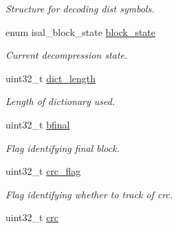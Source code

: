 \begin{DoxyCompactItemize}
\begin{DoxyCompactList}\small\item\em Structure for decoding dist symbols. \end{DoxyCompactList}\item 
\hypertarget{structinflate__state_ac0bb6a4a584fb515a000d6f1be0f2711}{enum isal\-\_\-block\-\_\-state \hyperlink{structinflate__state_ac0bb6a4a584fb515a000d6f1be0f2711}{block\-\_\-state}}\label{structinflate__state_ac0bb6a4a584fb515a000d6f1be0f2711}

\begin{DoxyCompactList}\small\item\em Current decompression state. \end{DoxyCompactList}\item 
\hypertarget{structinflate__state_a7a359006ca174357e69db75fd9e038fe}{uint32\-\_\-t \hyperlink{structinflate__state_a7a359006ca174357e69db75fd9e038fe}{dict\-\_\-length}}\label{structinflate__state_a7a359006ca174357e69db75fd9e038fe}

\begin{DoxyCompactList}\small\item\em Length of dictionary used. \end{DoxyCompactList}\item 
\hypertarget{structinflate__state_acf6d2c8ab990a35b45057f592051c7be}{uint32\-\_\-t \hyperlink{structinflate__state_acf6d2c8ab990a35b45057f592051c7be}{bfinal}}\label{structinflate__state_acf6d2c8ab990a35b45057f592051c7be}

\begin{DoxyCompactList}\small\item\em Flag identifying final block. \end{DoxyCompactList}\item 
\hypertarget{structinflate__state_ab2d3dac9eb492d567e151e8301a92b79}{uint32\-\_\-t \hyperlink{structinflate__state_ab2d3dac9eb492d567e151e8301a92b79}{crc\-\_\-flag}}\label{structinflate__state_ab2d3dac9eb492d567e151e8301a92b79}

\begin{DoxyCompactList}\small\item\em Flag identifying whether to track of crc. \end{DoxyCompactList}\item 
\hypertarget{structinflate__state_a3b6a7581b596c2ad3c0e797805d02955}{uint32\-\_\-t \hyperlink{structinflate__state_a3b6a7581b596c2ad3c0e797805d02955}{crc}}\label{structinflate__state_a3b6a7581b596c2ad3c0e797805d02955}


\end{DoxyCompactItemize}
